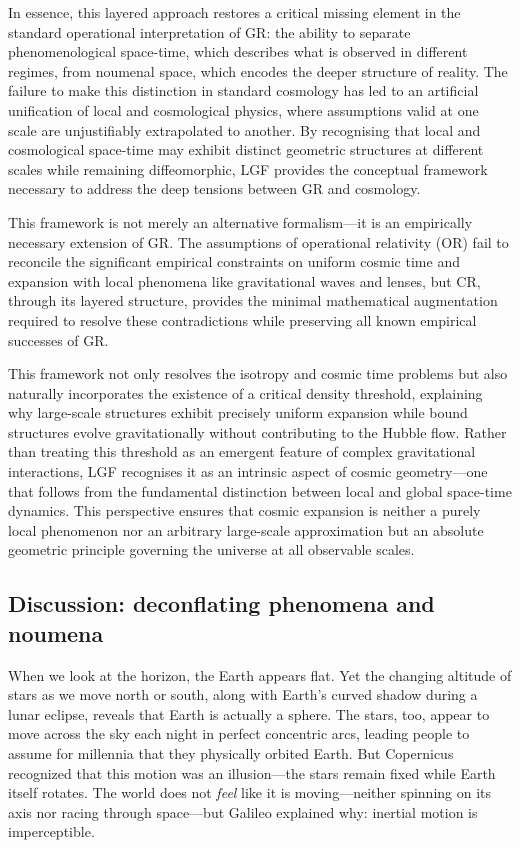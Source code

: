 \documentclass[aps,prd,reprint,superscriptaddress]{revtex4-2}
\begin{document}
In essence, this layered approach restores a critical missing element in the standard operational interpretation of GR: the ability to separate phenomenological space-time, which describes what is observed in different regimes, from noumenal space, which encodes the deeper structure of reality. The failure to make this distinction in standard cosmology has led to an artificial unification of local and cosmological physics, where assumptions valid at one scale are unjustifiably extrapolated to another. By recognising that local and cosmological space-time may exhibit distinct geometric structures at different scales while remaining diffeomorphic, LGF provides the conceptual framework necessary to address the deep tensions between GR and cosmology. 

This framework is not merely an alternative formalism---it is an empirically necessary extension of GR. The assumptions of operational relativity (OR) fail to reconcile the significant empirical constraints on uniform cosmic time and expansion with local phenomena like gravitational waves and lenses, but CR, through its layered structure, provides the minimal mathematical augmentation required to resolve these contradictions while preserving all known empirical successes of GR.

This framework not only resolves the isotropy and cosmic time problems but also naturally incorporates the existence of a critical density threshold, explaining why large-scale structures exhibit precisely uniform expansion while bound structures evolve gravitationally without contributing to the Hubble flow. Rather than treating this threshold as an emergent feature of complex gravitational interactions, LGF recognises it as an intrinsic aspect of cosmic geometry---one that follows from the fundamental distinction between local and global space-time dynamics. This perspective ensures that cosmic expansion is neither a purely local phenomenon nor an arbitrary large-scale approximation but an absolute geometric principle governing the universe at all observable scales.

\subsection{Discussion: deconflating phenomena and noumena}\label{sec:noum}

When we look at the horizon, the Earth appears flat. Yet the changing altitude of stars as we move north or south, along with Earth's curved shadow during a lunar eclipse, reveals that Earth is actually a sphere. The stars, too, appear to move across the sky each night in perfect concentric arcs, leading people to assume for millennia that they physically orbited Earth. But Copernicus recognized that this motion was an illusion---the stars remain fixed while Earth itself rotates. The world does not \textit{feel} like it is moving---neither spinning on its axis nor racing through space---but Galileo explained why: inertial motion is imperceptible.
\end{document}
